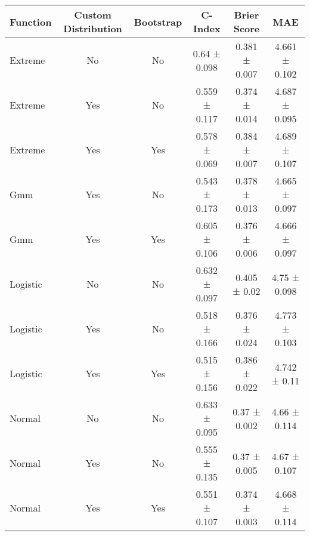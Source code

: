 \begin{tabular}{lccccc}
\toprule
Function & Custom Distribution & Bootstrap & C-Index & Brier Score & MAE \\
\midrule
Extreme & No & No & 0.64 ± 0.098 & 0.381 ± 0.007 & 4.661 ± 0.102 \\
Extreme & Yes & No & 0.559 ± 0.117 & 0.374 ± 0.014 & 4.687 ± 0.095 \\
Extreme & Yes & Yes & 0.578 ± 0.069 & 0.384 ± 0.007 & 4.689 ± 0.107 \\
Gmm & Yes & No & 0.543 ± 0.173 & 0.378 ± 0.013 & 4.665 ± 0.097 \\
Gmm & Yes & Yes & 0.605 ± 0.106 & 0.376 ± 0.006 & 4.666 ± 0.097 \\
Logistic & No & No & 0.632 ± 0.097 & 0.405 ± 0.02 & 4.75 ± 0.098 \\
Logistic & Yes & No & 0.518 ± 0.166 & 0.376 ± 0.024 & 4.773 ± 0.103 \\
Logistic & Yes & Yes & 0.515 ± 0.156 & 0.386 ± 0.022 & 4.742 ± 0.11 \\
Normal & No & No & 0.633 ± 0.095 & 0.37 ± 0.002 & 4.66 ± 0.114 \\
Normal & Yes & No & 0.555 ± 0.135 & 0.37 ± 0.005 & 4.67 ± 0.107 \\
Normal & Yes & Yes & 0.551 ± 0.107 & 0.374 ± 0.003 & 4.668 ± 0.114 \\
\bottomrule
\end{tabular}
